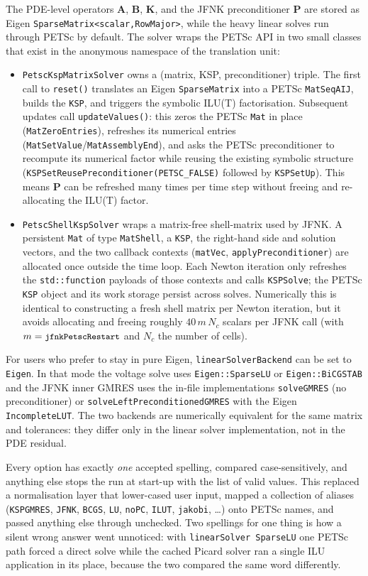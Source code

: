 \documentclass[11pt,a4paper]{article}
\newcommand{\code}[1]{\texttt{\small #1}}
\newcommand{\Kstif}{\mathbf{K}}
\newcommand{\Aimp}{\mathbf{A}}
\newcommand{\Bimp}{\mathbf{B}}
\begin{document}
The PDE-level operators $\Aimp$, $\Bimp$, $\Kstif$, and the JFNK preconditioner
$\mathbf{P}$ are stored as Eigen \code{SparseMatrix<scalar,RowMajor>}, while the
heavy linear solves run through PETSc by default. The solver wraps the PETSc
API in two small classes that exist in the anonymous namespace of the
translation unit:
\begin{itemize}
\item \code{PetscKspMatrixSolver} owns a (matrix, KSP, preconditioner)
triple. The first call to \code{reset()} translates an Eigen \code{SparseMatrix}
into a PETSc \code{MatSeqAIJ}, builds the \code{KSP}, and triggers the symbolic
ILU(T) factorisation. Subsequent updates call
\code{updateValues()}: this zeros the PETSc \code{Mat} in place
(\code{MatZeroEntries}), refreshes its numerical entries
(\code{MatSetValue}/\code{MatAssemblyEnd}), and asks the PETSc preconditioner to
recompute its numerical factor while reusing the existing symbolic structure
(\code{KSPSetReusePreconditioner(PETSC\_FALSE)} followed by
\code{KSPSetUp}). This means $\mathbf{P}$ can be refreshed many times per
time step without freeing and re-allocating the ILU(T) factor.
\item \code{PetscShellKspSolver} wraps a matrix-free shell-matrix used by
JFNK. A persistent \code{Mat} of type \code{MatShell}, a \code{KSP}, the
right-hand side and solution vectors, and the two callback contexts
(\code{matVec}, \code{applyPreconditioner}) are allocated once outside the time
loop. Each Newton iteration only refreshes the
\code{std::function} payloads of those contexts and calls \code{KSPSolve}; the
PETSc \code{KSP} object and its work storage persist across solves.
Numerically this is identical to
constructing a fresh shell matrix per Newton iteration, but it avoids
allocating and freeing roughly $40\,m\,N_c$ scalars per JFNK call (with
$m=\code{jfnkPetscRestart}$ and $N_c$ the number of cells).
\end{itemize}
For users who prefer to stay in pure Eigen, \code{linearSolverBackend} can be
set to \code{Eigen}. In that mode the voltage solve uses
\code{Eigen::SparseLU} or \code{Eigen::BiCGSTAB} and the JFNK inner GMRES uses
the in-file implementations \code{solveGMRES} (no preconditioner) or
\code{solveLeftPreconditionedGMRES} with the Eigen \code{IncompleteLUT}.
The two backends are numerically equivalent for the same matrix and tolerances:
they differ only in the linear solver implementation, not in the PDE residual.

Every option has exactly \emph{one} accepted spelling, compared
case-sensitively, and anything else stops the run at start-up with the list of
valid values. This replaced a normalisation layer that lower-cased user input,
mapped a collection of aliases (\code{KSPGMRES}, \code{JFNK}, \code{BCGS},
\code{LU}, \code{noPC}, \code{ILUT}, \code{jakobi}, \ldots) onto PETSc names,
and passed anything else through unchecked. Two spellings for one thing is how a
silent wrong answer went unnoticed: with \code{linearSolver SparseLU} one PETSc
path forced a direct solve while the cached Picard solver ran a single ILU
application in its place, because the two compared the same word differently.
\end{document}
